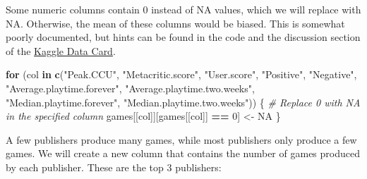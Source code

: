 \documentclass[
]{article}
\newenvironment{Shaded}{\begin{snugshade}}{\end{snugshade}}
\newcommand{\CommentTok}[1]{\textcolor[rgb]{0.56,0.35,0.01}{\textit{#1}}}
\newcommand{\ConstantTok}[1]{\textcolor[rgb]{0.56,0.35,0.01}{#1}}
\newcommand{\ControlFlowTok}[1]{\textcolor[rgb]{0.13,0.29,0.53}{\textbf{#1}}}
\newcommand{\DecValTok}[1]{\textcolor[rgb]{0.00,0.00,0.81}{#1}}
\newcommand{\FunctionTok}[1]{\textcolor[rgb]{0.13,0.29,0.53}{\textbf{#1}}}
\newcommand{\NormalTok}[1]{#1}
\newcommand{\OtherTok}[1]{\textcolor[rgb]{0.56,0.35,0.01}{#1}}
\newcommand{\SpecialCharTok}[1]{\textcolor[rgb]{0.81,0.36,0.00}{\textbf{#1}}}
\newcommand{\StringTok}[1]{\textcolor[rgb]{0.31,0.60,0.02}{#1}}
\begin{document}
\begin{Shaded}
\end{Shaded}

Some numeric columns contain 0 instead of NA values, which we will
replace with NA. Otherwise, the mean of these columns would be biased.
This is somewhat poorly documented, but hints can be found in the code
and the discussion section of the
\href{https://www.kaggle.com/datasets/fronkongames/steam-games-dataset/data}{Kaggle
Data Card}.

\begin{Shaded}
\begin{Highlighting}[]
\ControlFlowTok{for}\NormalTok{ (col }\ControlFlowTok{in} \FunctionTok{c}\NormalTok{(}\StringTok{"Peak.CCU"}\NormalTok{, }\StringTok{"Metacritic.score"}\NormalTok{, }\StringTok{"User.score"}\NormalTok{, }\StringTok{"Positive"}\NormalTok{, }\StringTok{"Negative"}\NormalTok{,}
              \StringTok{"Average.playtime.forever"}\NormalTok{, }\StringTok{"Average.playtime.two.weeks"}\NormalTok{,}
              \StringTok{"Median.playtime.forever"}\NormalTok{, }\StringTok{"Median.playtime.two.weeks"}\NormalTok{)) \{}
    \CommentTok{\# Replace 0 with NA in the specified column}
\NormalTok{    games[[col]][games[[col]] }\SpecialCharTok{==} \DecValTok{0}\NormalTok{] }\OtherTok{\textless{}{-}} \ConstantTok{NA}
\NormalTok{\}}
\end{Highlighting}
\end{Shaded}

A few publishers produce many games, while most publishers only produce
a few games. We will create a new column that contains the number of
games produced by each publisher. These are the top 3 publishers:
\end{document}
